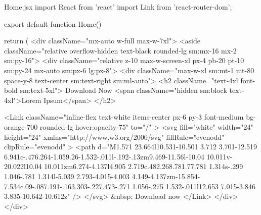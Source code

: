 Home.jsx
                    import React from 'react'
                    import { Link } from 'react-router-dom';

                    export default function Home() {
                        return (
                            <div className="mx-auto w-full max-w-7xl">
                                <aside className="relative overflow-hidden text-black rounded-lg sm:mx-16 mx-2 sm:py-16">
                                    <div className="relative z-10 max-w-screen-xl px-4  pb-20 pt-10 sm:py-24 mx-auto sm:px-6 lg:px-8">
                                        <div className="max-w-xl sm:mt-1 mt-80 space-y-8 text-center sm:text-right sm:ml-auto">
                                            <h2 className="text-4xl font-bold sm:text-5xl">
                                                Download Now
                                                <span className="hidden sm:block text-4xl">Lorem Ipsum</span>
                                            </h2>

                                            <Link
                                                className="inline-flex text-white items-center px-6 py-3 font-medium bg-orange-700 rounded-lg hover:opacity-75"
                                                to="/"
                                            >
                                                <svg
                                                    fill="white"
                                                    width="24"
                                                    height="24"
                                                    xmlns="http://www.w3.org/2000/svg"
                                                    fillRule="evenodd"
                                                    clipRule="evenodd"
                                                >
                                                    <path d="M1.571 23.664l10.531-10.501 3.712 3.701-12.519 6.941c-.476.264-1.059.26-1.532-.011l-.192-.13zm9.469-11.56l-10.04 10.011v-20.022l10.04 10.011zm6.274-4.137l4.905 2.719c.482.268.781.77.781 1.314s-.299 1.046-.781 1.314l-5.039 2.793-4.015-4.003 4.149-4.137zm-15.854-7.534c.09-.087.191-.163.303-.227.473-.271 1.056-.275 1.532-.011l12.653 7.015-3.846 3.835-10.642-10.612z" />
                                                </svg>
                                                &nbsp; Download now
                                            </Link>
                                        </div>
                                    </div>

}
